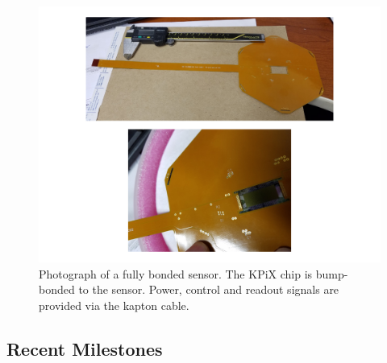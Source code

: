 \begin{figure}
\begin{minipage}[b]{.34\textwidth}
		\caption{Drawing of an individual silicon sensor, segmented into 1024 pixels of \SI{13}{\milli\meter\squared} each}
		\label{fig:Calorimeter:SiDECAL:sensor-drawing}
	\end{minipage}\hfill
	\begin{minipage}[b]{.39\textwidth}
		\includegraphics[width=\linewidth,valign=t]{Calorimeter/SiliconTungstenSiD/flex.pdf}
		\caption{Photograph of a fully bonded sensor. The KPiX chip is bump-bonded to the sensor. Power, control and readout signals are provided
via the kapton cable.}
		\label{fig:Calorimeter:SiDECAL:bonded-sensor}
	\end{minipage}
\end{figure}    
               
\subsection{Recent Milestones}
